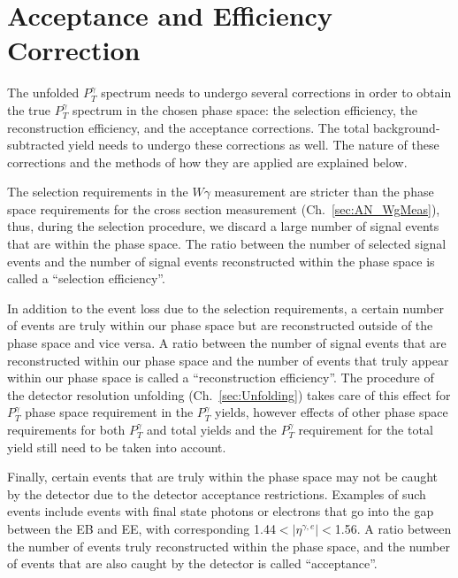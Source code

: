 \section{Acceptance and Efficiency Correction}
\label{sec:AccXEff}


The unfolded $P_T^{\gamma}$ spectrum needs to undergo several corrections in order to obtain the true $P_T^{\gamma}$ spectrum in the chosen phase space: the selection efficiency, the reconstruction efficiency, and the acceptance corrections. The total background-subtracted yield needs to undergo these corrections as well. The nature of these corrections and the methods of how they are applied are explained below.

The selection requirements in the $W\gamma$ measurement are stricter than the phase space requirements for the cross section measurement (Ch.~\ref{sec:AN_WgMeas}), thus, during the selection procedure, we discard a large number of signal events that are within the phase space. The ratio between the number of selected signal events and the number of signal events reconstructed within the phase space is called a ``selection efficiency''. 

In addition to the event loss due to the selection requirements, a certain number of events are truly within our phase space but are reconstructed outside of the phase space and vice versa. A ratio between the number of signal events that are reconstructed within our phase space and the number of events that truly appear within our phase space is called a ``reconstruction efficiency''. The procedure of the detector resolution unfolding (Ch.~\ref{sec:Unfolding}) takes care of this effect for $P_T^{\gamma}$ phase space requirement in the $P_T^{\gamma}$ yields, however effects of other phase space requirements for both $P_T^{\gamma}$ and total yields and the $P_T^{\gamma}$ requirement for the total yield still need to be taken into account.

Finally, certain events that are truly within the phase space may not be caught by the detector due to the detector acceptance restrictions. Examples of such events include events with final state photons or electrons that go into the gap between the EB and EE, with corresponding 1.44$<|\eta^{\gamma,e}|<$1.56. A ratio between the number of events truly reconstructed within the phase space, and the number of events that are also caught by the detector is called ``acceptance''.  

